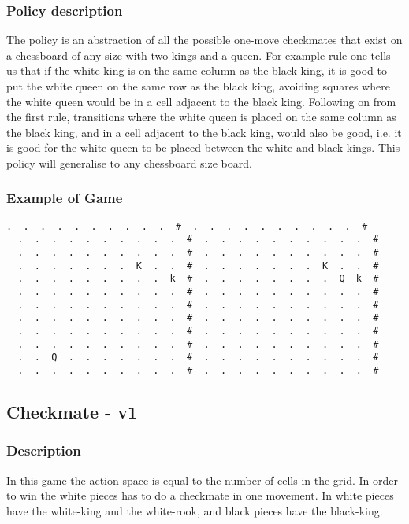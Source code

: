 \documentclass[a4paper]{article}
\begin{document}
\subsubsection{Policy description}
The policy is an abstraction of all the possible one-move checkmates that exist on a chessboard of any size with two kings and a queen. For example rule one tells us that if the white king is on the same column as the black king, it is good to put the white queen on the same row as the black king, avoiding squares where the white queen would be in a cell adjacent to the black king. Following on from the first rule, transitions where the white queen is placed on the same column as the black king, and in a cell adjacent to the black king, would also be good, i.e. it is good for the white queen to be placed between the white and black kings. This policy will generalise to any chessboard size board.

\subsubsection{Example of Game}
\begin{Verbatim}[fontsize=\footnotesize]
  .  .  .  .  .  .  .  .  .  .  #  .  .  .  .  .  .  .  .  .  .  #
  .  .  .  .  .  .  .  .  .  .  #  .  .  .  .  .  .  .  .  .  .  #
  .  .  .  .  .  .  .  .  .  .  #  .  .  .  .  .  .  .  .  .  .  #
  .  .  .  .  .  .  .  K  .  .  #  .  .  .  .  .  .  .  K  .  .  #
  .  .  .  .  .  .  .  .  .  k  #  .  .  .  .  .  .  .  .  Q  k  #
  .  .  .  .  .  .  .  .  .  .  #  .  .  .  .  .  .  .  .  .  .  #
  .  .  .  .  .  .  .  .  .  .  #  .  .  .  .  .  .  .  .  .  .  #
  .  .  .  .  .  .  .  .  .  .  #  .  .  .  .  .  .  .  .  .  .  #
  .  .  .  .  .  .  .  .  .  .  #  .  .  .  .  .  .  .  .  .  .  #
  .  .  .  .  .  .  .  .  .  .  #  .  .  .  .  .  .  .  .  .  .  #
  .  .  Q  .  .  .  .  .  .  .  #  .  .  .  .  .  .  .  .  .  .  #
  .  .  .  .  .  .  .  .  .  .  #  .  .  .  .  .  .  .  .  .  .  #
\end{Verbatim}

\subsection{Checkmate - v1}
\subsubsection{Description}
In this game the action space is equal to the number of cells in the grid. In order to win the white pieces has to do a checkmate in one movement. In white pieces have the white-king and the white-rook, and black pieces have the black-king.
\end{document}
